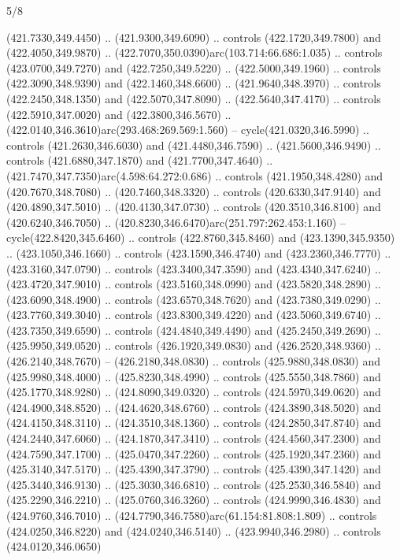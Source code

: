 \begin{flagdescription}{5/8}
\begin{scope}[xshift=0.5\flaglength,yshift=0.5\flagwidth,scale=\flagwidth/475.63]
\begin{scope}[y=0.8pt, x=0.8pt, yscale=-1, xscale=1,shift={(-450,-300)}]
\begin{scope}[cm={{1.0,0.0,0.0,1.0,(-0.0002,0.12556)}},cm={{1.0,0.0,0.0,1.0,(0.00179,0.0)}}]
\begin{scope}[cm={{1.01375,0.0,0.0,1.01375,(-5.36379,-4.94943)}}]
  (421.7330,349.4450) .. (421.9300,349.6090) .. controls (422.1720,349.7800) and
  (422.4050,349.9870) .. (422.7070,350.0390)arc(103.714:66.686:1.035) ..
  controls (423.0700,349.7270) and (422.7250,349.5220) .. (422.5000,349.1960) ..
  controls (422.3090,348.9390) and (422.1460,348.6600) .. (421.9640,348.3970) ..
  controls (422.2450,348.1350) and (422.5070,347.8090) .. (422.5640,347.4170) ..
  controls (422.5910,347.0020) and (422.3800,346.5670) ..
  (422.0140,346.3610)arc(293.468:269.569:1.560) -- cycle(421.0320,346.5990) ..
  controls (421.2630,346.6030) and (421.4480,346.7590) .. (421.5600,346.9490) ..
  controls (421.6880,347.1870) and (421.7700,347.4640) ..
  (421.7470,347.7350)arc(4.598:64.272:0.686) .. controls (421.1950,348.4280) and
  (420.7670,348.7080) .. (420.7460,348.3320) .. controls (420.6330,347.9140) and
  (420.4890,347.5010) .. (420.4130,347.0730) .. controls (420.3510,346.8100) and
  (420.6240,346.7050) .. (420.8230,346.6470)arc(251.797:262.453:1.160) --
  cycle(422.8420,345.6460) .. controls (422.8760,345.8460) and
  (423.1390,345.9350) .. (423.1050,346.1660) .. controls (423.1590,346.4740) and
  (423.2360,346.7770) .. (423.3160,347.0790) .. controls (423.3400,347.3590) and
  (423.4340,347.6240) .. (423.4720,347.9010) .. controls (423.5160,348.0990) and
  (423.5820,348.2890) .. (423.6090,348.4900) .. controls (423.6570,348.7620) and
  (423.7380,349.0290) .. (423.7760,349.3040) .. controls (423.8300,349.4220) and
  (423.5060,349.6740) .. (423.7350,349.6590) .. controls (424.4840,349.4490) and
  (425.2450,349.2690) .. (425.9950,349.0520) .. controls (426.1920,349.0830) and
  (426.2520,348.9360) .. (426.2140,348.7670) -- (426.2180,348.0830) .. controls
  (425.9880,348.0830) and (425.9980,348.4000) .. (425.8230,348.4990) .. controls
  (425.5550,348.7860) and (425.1770,348.9280) .. (424.8090,349.0320) .. controls
  (424.5970,349.0620) and (424.4900,348.8520) .. (424.4620,348.6760) .. controls
  (424.3890,348.5020) and (424.4150,348.3110) .. (424.3510,348.1360) .. controls
  (424.2850,347.8740) and (424.2440,347.6060) .. (424.1870,347.3410) .. controls
  (424.4560,347.2300) and (424.7590,347.1700) .. (425.0470,347.2260) .. controls
  (425.1920,347.2360) and (425.3140,347.5170) .. (425.4390,347.3790) .. controls
  (425.4390,347.1420) and (425.3440,346.9130) .. (425.3030,346.6810) .. controls
  (425.2530,346.5840) and (425.2290,346.2210) .. (425.0760,346.3260) .. controls
  (424.9990,346.4830) and (424.9760,346.7010) ..
  (424.7790,346.7580)arc(61.154:81.808:1.809) .. controls (424.0250,346.8220)
  and (424.0240,346.5140) .. (423.9940,346.2980) .. controls (424.0120,346.0650)

\end{scope}
\end{scope}
\end{scope}
\end{scope}
\end{flagdescription}
